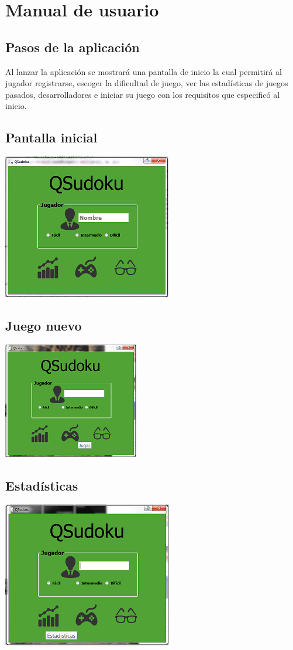 \documentclass[11pt]{book} %
\begin{document}
\section{Manual de usuario}
\subsection{Pasos de la aplicación}

	Al lanzar la aplicación se mostrará una pantalla de inicio la cual permitirá al jugador registrarse, escoger la dificultad de juego, ver las estadísticas de juegos pasados, desarrolladores e iniciar su juego con los requisitos que especificó al inicio.
\subsection{Pantalla inicial}
\includegraphics{inicio.png}
\subsection{Juego nuevo}
\includegraphics{Jugar.png}
\subsection{Estadísticas}
\includegraphics{estadist.png}
\end{document}
